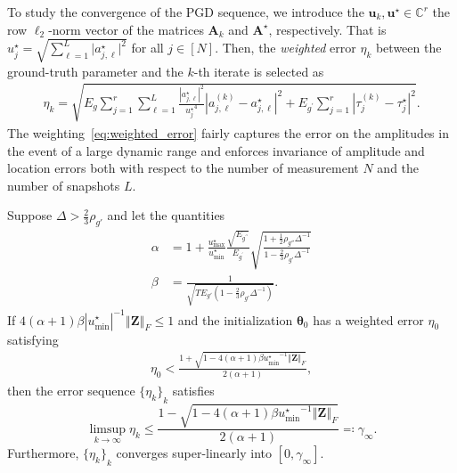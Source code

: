 \documentclass[conference,english]{IEEEtran}
\begin{document}
To study the convergence of the PGD sequence, we introduce the $\bm{u}_k, \bm{u}^\star \in \mathbb{C}^r$ the row $\ell_2$-norm vector of the matrices $\bm{A}_k$ and $\bm{A}^\star$, respectively. That is
\(    u_j^{\star} = \sqrt{\sum_{\ell=1}^L {{|a_{j,\ell}^{\star}}|}^2}
\) for all $j\in [N]$. Then, the \emph{weighted} error $\eta_k$ between the ground-truth parameter and the $k$-th iterate is selected as
\begin{align}\label{eq:weighted_error}
    \eta_k = \sqrt{E_g \sum_{j=1}^r \sum_{\ell = 1}^L\frac{\left\vert a^\star_{j,\ell}\right\vert^2}{u{^\star_j}^4} 
     \left\vert a^{(k)}_{j,\ell} - a^\star_{j,\ell} \right\vert^2 + E_{g^\prime} \sum_{j=1}^r \left\vert \tau^{(k)}_{j} - \tau^\star_j \right\vert^2}.
\end{align}
The weighting~\eqref{eq:weighted_error} fairly captures the error on the amplitudes in the event of a large dynamic range and enforces invariance of amplitude and location errors both with respect to the number of measurement $N$ and the number of snapshots $L$.

\begin{theorem}\label{thm:conergence_pgd}
    Suppose $\Delta > \frac{2}{3}\rho_{g'}$ and let the quantities
    \begin{align*}
    \alpha &= 1 + \frac{u^\star_{\max}}{u^\star_{\min}} \frac{\sqrt{E_{g^{\prime\prime}}}}{E_{g^\prime}} \sqrt{\frac{1 + \frac{1}{2} \rho_{g''} \Delta^{-1}}{1-\tfrac{2}{3}\rho_{g'} \Delta^{-1}}} \\
    \beta &= \frac{1}{\sqrt{T E_{g'}(1-\tfrac{2}{3}\rho_{g'} \Delta^{-1})}}.
    \end{align*}
    If $4(\alpha+1)\beta \left\vert u_{\min}^\star \right\vert^{-1} \left\Vert \bm{Z} \right\Vert_F \leq 1$ and the initialization $\bm{\theta}_0$ has a weighted error $\eta_0$ satisfying
    \begin{align*}
        \eta_0 < \frac{1 + \sqrt{1- 4(\alpha+1)\beta  {u_{\min}^\star}^{-1} \left\Vert \bm{Z} \right\Vert_F}}{2 (\alpha+1)},
    \end{align*}
    then the error sequence ${\{\eta_k\}}_k$ satisfies
    \begin{equation} \label{eq:cv}
        \limsup_{k\to \infty} \eta_k \leq  \frac{1 - \sqrt{1- 4(\alpha+1)\beta  {u_{\min}^\star}^{-1} \left\Vert \bm{Z} \right\Vert_F}}{2 (\alpha+1)} \eqqcolon \gamma_\infty.
    \end{equation}
    Furthermore, ${\{\eta_k\}}_k$ converges super-linearly into $[0,\gamma_\infty]$.
\end{theorem}
\end{document}
